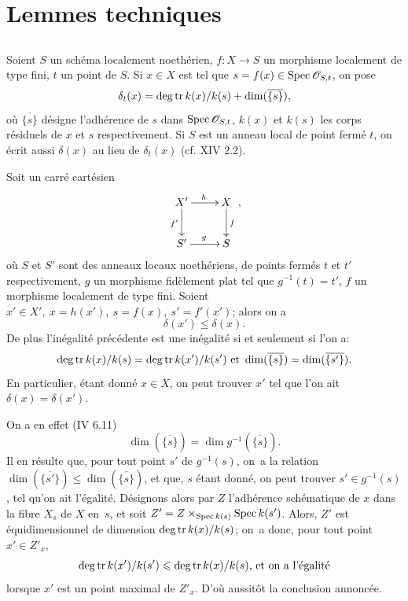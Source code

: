 \section{Lemmes techniques} \label{XIV.2}

\subsection{} \label{XIV.2.1}
Soient $S$ un sch\'ema localement noeth\'erien, $f:X\to S$ un morphisme localement de type fini, $t$ un point de $S$. Si $x\in X$ est tel que $s=f(x)\in\operatorname{Spec}{\mathscr O}_{S, t}$, on pose
$$
\delta_t(x)=\operatorname{deg\,tr} k(x)/k(s)+\dim(\overline{\{s\}}),
$$
o\`u $\overline{\{s\}}$ d\'esigne l'adh\'erence de $s$ dans $\operatorname{Spec}{\mathscr O}_{S, t}$, $k(x)$ et $k(s)$ les corps r\'esiduels de $x$ et $s$ respectivement. Si $S$ est un anneau local de point ferm\'e $t$, on \'ecrit aussi $\delta(x)$ au lieu de $\delta_t(x)$ (cf.  XIV 2.2).
\begin{sublemme} \label{XIV.2.1.1} Soit un carr\'e cart\'esien
$$
\xymatrix{X^{\prime}\ar[r]^{h}\ar[d]_{f^{\prime}}&X\ar[d]^f\\S^{\prime}\ar[r]^g&S},
$$
o\`u $S$ et $S'$ sont des anneaux locaux noeth\'eriens, de points ferm\'es $t$ et $t'$ respectivement, $g$ un morphisme fid\`element plat tel que $g^{-1}(t)=t'$, $f$ un morphisme localement de type fini. Soient $x'\in X',\ x=h(x'),\ s=f(x),\ s'=f'(x')$; alors on a
$$
\delta(x')\leq\delta(x).
$$
De plus l'in\'egalit\'e pr\'ec\'edente est une in\'egalit\'e si et seulement si l'on a:
$$
\operatorname{deg\,tr} k(x)/k(s)=\operatorname{deg\,tr} k(x')/k(s')\text{ et }\dim(\overline{\{s\}})=\dim(\overline{\{s'\}}).
$$
En particulier, \'etant donn\'e $x\in X$, on peut trouver $x'$ tel que l'on ait $\delta(x)=\delta(x')$.
\end{sublemme}

On a en effet (\EGA IV 6.11)
$$
\dim(\overline{\{s\}})=\dim g^{-1}(\overline{\{s\}}).
$$
Il en r\'esulte que, pour tout point $s'$ de $g^{-1}(s)$, on~a la relation $\dim(\overline{\{s'\}})\leq \dim(\overline{\{s\}})$, et que, $s$ \'etant donn\'e, on peut trouver $s'\in g^{-1}(s)$, tel qu'on ait l'\'egalit\'e. D\'esignons alors par $Z$ l'adh\'erence sch\'ematique de $x$ dans la fibre $X_s$ de $X$ en~$s$, et soit $Z'=Z\times_{\operatorname{Spec} k(s)}\operatorname{Spec} k(s')$. Alors, $Z'$ est \'equidimensionnel de dimension $\operatorname{deg\,tr} k(x)/k(s)$; on~a donc, pour tout point $x'\in Z'_{x}$,
$$
\operatorname{deg\,tr} k(x')/k(s')\leqslant\operatorname{deg\,tr} k(x)/k(s)\text{, et on~a l'égalité}$$
lorsque $x'$ est un point maximal de $Z'_x$. D'o\`u aussit\^{o}t la conclusion annonc\'ee.

